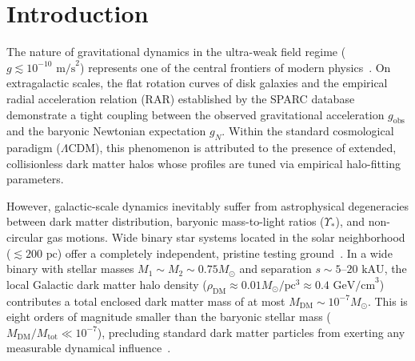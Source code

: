 \documentclass[aps,prd,reprint,superscriptaddress,nofootinbib,floatfix,amsmath,amssymb]{revtex4-2}
\begin{document}

\maketitle

\section{Introduction}
\label{sec:intro}

The nature of gravitational dynamics in the ultra-weak field regime ($g \lesssim 10^{-10}\text{ m/s}^2$) represents one of the central frontiers of modern physics~\cite{clifton2012modified}. On extragalactic scales, the flat rotation curves of disk galaxies and the empirical radial acceleration relation (RAR) established by the SPARC database~\cite{lelli2016sparc,mcgaugh2016radial} demonstrate a tight coupling between the observed gravitational acceleration $g_{\text{obs}}$ and the baryonic Newtonian expectation $g_N$. Within the standard cosmological paradigm ($\Lambda$CDM), this phenomenon is attributed to the presence of extended, collisionless dark matter halos whose profiles are tuned via empirical halo-fitting parameters.

However, galactic-scale dynamics inevitably suffer from astrophysical degeneracies between dark matter distribution, baryonic mass-to-light ratios ($\Upsilon_*$), and non-circular gas motions. Wide binary star systems located in the solar neighborhood ($\lesssim 200\text{ pc}$) offer a completely independent, pristine testing ground~\cite{pittordis2023testing,banik2024strong}. In a wide binary with stellar masses $M_1 \sim M_2 \sim 0.75 M_\odot$ and separation $s \sim 5\text{--}20\text{ kAU}$, the local Galactic dark matter halo density ($\rho_{\text{DM}} \approx 0.01 M_\odot/\text{pc}^3 \approx 0.4\text{ GeV/cm}^3$) contributes a total enclosed dark matter mass of at most $M_{\text{DM}} \sim 10^{-7} M_\odot$. This is eight orders of magnitude smaller than the baryonic stellar mass ($M_{\text{DM}} / M_{\text{tot}} \ll 10^{-7}$), precluding standard dark matter particles from exerting any measurable dynamical influence~\cite{milgrom1983modification,bekenstein2004relativistic}.
\end{document}
